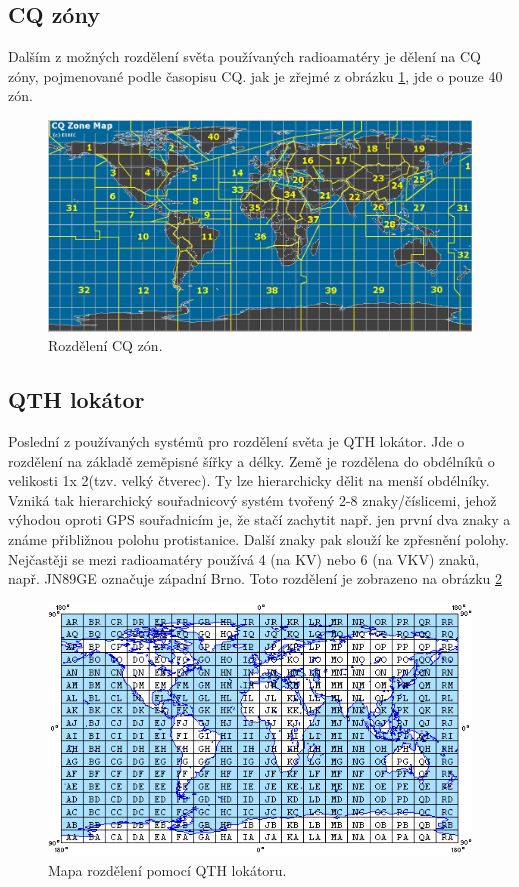 \subsection{CQ zóny}

Dalším z možných rozdělení světa používaných radioamatéry je dělení na CQ zóny, pojmenované podle časopisu CQ.
jak je zřejmé z obrázku \ref{fig:cq_zony}, jde o pouze 40 zón.

\begin{figure}[h]
\centering
\includegraphics[trim=0cm 0cm 0cm 0cm, scale=0.4]{fig/cq-zone}
\caption{Rozdělení CQ zón.}
\label{fig:cq_zony}
\end{figure}

\subsection{QTH lokátor}

Poslední z používaných systémů pro rozdělení světa je QTH lokátor. Jde o rozdělení na základě zeměpisné šířky a délky.
Země je rozdělena do obdélníků o velikosti 1\degree x 2\degree (tzv. velký
čtverec). Ty lze hierarchicky dělit na menší obdélníky. Vzniká tak hierarchický
souřadnicový systém tvořený 2-8 znaky/číslicemi, jehož výhodou  oproti GPS
souřadnicím je, že stačí zachytit např. jen první dva znaky a známe přibližnou
polohu protistanice. Další znaky pak slouží ke zpřesnění polohy. Nejčastěji se
mezi radioamatéry používá 4 (na KV) nebo 6 (na VKV) znaků, např. JN89GE označuje
západní Brno. Toto rozdělení je zobrazeno na obrázku \ref{fig:qth}

\begin{figure}[h]
\centering
\includegraphics[trim=0cm 0cm 0cm 0cm, scale=0.7]{fig/QTH_locator}
\caption{Mapa rozdělení pomocí QTH lokátoru.}
\label{fig:qth}
\end{figure}

